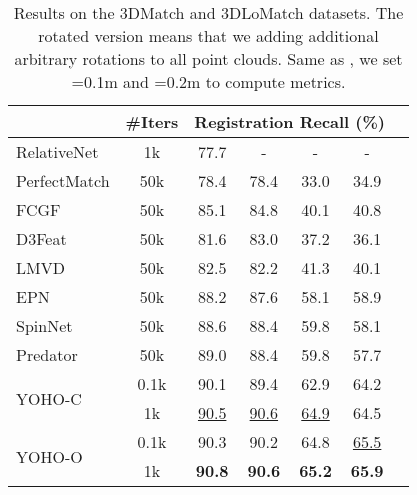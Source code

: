 \begin{table}[]
\begin{center}
{\begin{tabular}{lcccccc}
                             & \#Iters              & \multicolumn{4}{c}{Registration Recall (\%)}                  \\ \hline
RelativeNet\cite{deng20193d} & 1k             & 77.7          & -             & -             & -             \\
PerfectMatch\cite{smooth}    & 50k                  & 78.4          & 78.4          & 33.0          & 34.9          \\
FCGF\cite{FCGF}              & 50k                  & 85.1          & 84.8          & 40.1          & 40.8          \\
D3Feat\cite{d3feat}          & 50k                  & 81.6          & 83.0          & 37.2          & 36.1          \\
LMVD\cite{li2020end}         & 50k                  & 82.5          & 82.2          & 41.3          & 40.1          \\
EPN\cite{EPN}                & 50k                  & 88.2          & 87.6          & 58.1          & 58.9           \\
SpinNet\cite{ao2020spinnet}  & 50k                  & 88.6          & 88.4          & 59.8          & 58.1          \\
Predator\cite{predator}      & 50k                  & 89.0          & 88.4          & 59.8          & 57.7          \\
\multirow{2}{*}{YOHO-C}      & 0.1k                 & 90.1          & 89.4          & 62.9          & 64.2          \\
                             & 1k                   & \underline{90.5}    & \underline{90.6}    & \underline{64.9}    & 64.5          \\
\multirow{2}{*}{YOHO-O}      & 0.1k                 & 90.3          & 90.2          & 64.8          & \underline{65.5}    \\
                             & 1k                   & \textbf{90.8}          & \textbf{90.6} & \textbf{65.2} & \textbf{65.9} \\
\bottomrule[1.3pt]
\end{tabular}}
\end{center}
\caption{Results on the 3DMatch and 3DLoMatch datasets. The rotated version means that we adding additional arbitrary rotations to all point clouds. Same as \cite{ao2020spinnet,predator}, we set =0.1m and =0.2m to compute metrics.}
\label{tab:main}
\vspace{-20pt}
\end{table}



